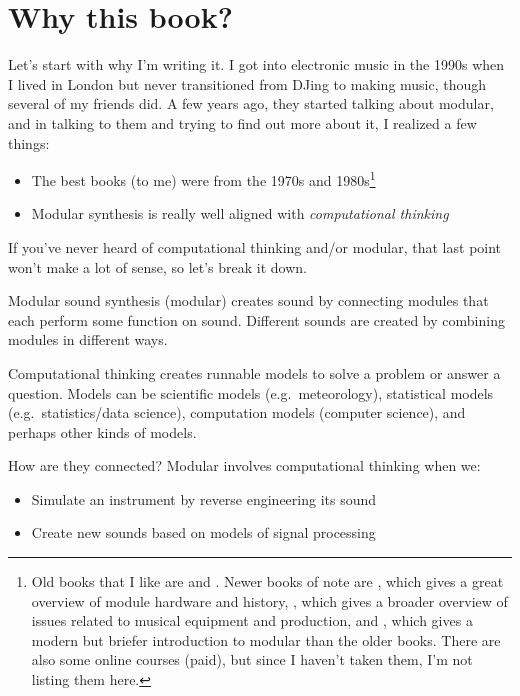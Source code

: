 \documentclass[
]{book}
\providecommand{\tightlist}{%
  \setlength{\itemsep}{0pt}\setlength{\parskip}{0pt}}
\begin{document}
\hypertarget{why-this-book}{%
\section{Why this book?}\label{why-this-book}}

Let's start with why I'm writing it.
I got into electronic music in the 1990s when I lived in London but never transitioned from DJing to making music, though several of my friends did.
A few years ago, they started talking about modular, and in talking to them and trying to find out more about it, I realized a few things:

\begin{itemize}
\tightlist
\item
  The best books (to me) were from the 1970s and 1980s\footnote{Old books that I like are \citet{Crombie1982} and \citet{Strange1983}. Newer books of note are \citet{Bjoern2018}, which gives a great overview of module hardware and history, \citet{Eliraz2022}, which gives a broader overview of issues related to musical equipment and production, and \citet{Dusha2020}, which gives a modern but briefer introduction to modular than the older books. There are also some online courses (paid), but since I haven't taken them, I'm not listing them here.}
\item
  Modular synthesis is really well aligned with \emph{computational thinking}
\end{itemize}

If you've never heard of computational thinking and/or modular, that last point won't make a lot of sense, so let's break it down.

Modular sound synthesis (modular) creates sound by connecting modules that each perform some function on sound.
Different sounds are created by combining modules in different ways.

Computational thinking creates runnable models to solve a problem or answer a question.
Models can be scientific models (e.g.~meteorology), statistical models (e.g.~statistics/data science), computation models (computer science), and perhaps other kinds of models.

How are they connected?
Modular involves computational thinking when we:

\begin{itemize}
\tightlist
\item
  Simulate an instrument by reverse engineering its sound
\item
  Create new sounds based on models of signal processing
\end{itemize}
\end{document}
